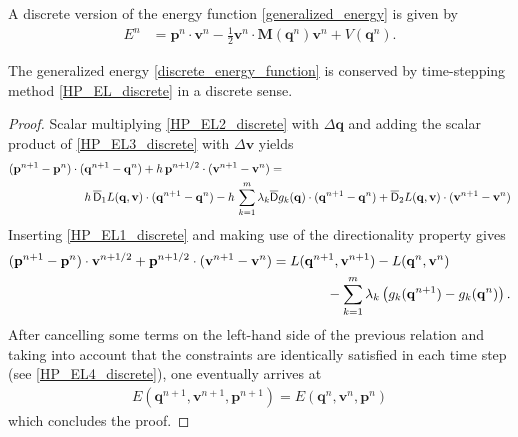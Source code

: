 \documentclass[10pt,a4paper]{amsart}
\newcommand{\DG}{\overline{\mathsf{D}}}
\newcommand{\npeh}{^{n+1/2}}
\newcommand{\npe}{^{n+1}}
\newcommand{\n}{^{n}}
\renewcommand{\vec}[1]{\ensuremath{\mbox{$\mathbf{#1}$}}}
\begin{document}
\begin{definition}
    A discrete version of the energy function \eqref{generalized_energy} is given by
    \begin{align} \label{discrete_energy_function}
        E\n & = \vec{p}\n \cdot \vec{v}\n - \frac{1}{2}\vec{v}\n \cdot \vec{M}(\vec{q}\n) \vec{v}\n + V(\vec{q}\n) .
    \end{align}
\end{definition}

\begin{proposition}
    The generalized energy \eqref{discrete_energy_function} is conserved by time-stepping method \eqref{HP_EL_discrete} in a discrete sense.
\end{proposition}

\begin{proof}
    Scalar multiplying \eqref{HP_EL2_discrete} with $\Delta \vec{q}$ and adding the scalar product of \eqref{HP_EL3_discrete} with $\Delta \vec{v}$ yields
    \begin{align}
        (\vec{p}\npe -\vec{p}\n) \cdot (\vec{q}\npe - \vec{q}\n) + h \, \vec{p}\npeh \cdot (\vec{v}\npe - \vec{v}\n)                                                           & =                                                                                                                  \\
        h \, \DG_1 L(\vec{q},\vec{v}) \cdot                                                                           (\vec{q}\npe - \vec{q}\n) - h\, \sum_{k=1}^{m} \lambda_k & \DG g_k(\vec{q}) \cdot (\vec{q}\npe - \vec{q}\n) + \DG_2 L(\vec{q},\vec{v}) \cdot (\vec{v}\npe - \vec{v}\n) \notag
    \end{align}
    Inserting \eqref{HP_EL1_discrete} and making use of the directionality property gives
    \begin{align}
        (\vec{p}\npe -\vec{p}\n) \cdot \vec{v}\npeh + \vec{p}\npeh \cdot (\vec{v}\npe - \vec{v}\n) & = L(\vec{q}\npe,\vec{v}\npe) - L(\vec{q}\n,\vec{v}\n)                                          \\
                                                                                                   & \qquad \qquad - \sum_{k=1}^{m} \lambda_k \left(g_k(\vec{q}\npe)-g_k(\vec{q}\n)\right) . \notag
    \end{align}
    After cancelling some terms on the left-hand side of the previous relation and taking into account that the constraints are identically satisfied in each time step (see \eqref{HP_EL4_discrete}), one eventually arrives at
    \begin{align}
        E(\vec{q}\npe,\vec{v}\npe, \vec{p}\npe) = E(\vec{q}\n,\vec{v}\n, \vec{p}\n)
    \end{align}
    which concludes the proof.
\end{proof}
\end{document}
